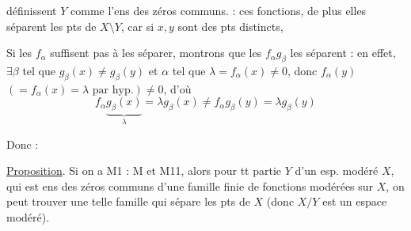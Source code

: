 
définissent $Y$ comme l'ens des zéros communs.  : ces fonctions, de plus elles séparent les pts de $X\setminus Y$, car si $x,y$ sont des pts distincts, 

Si les $f_\alpha$  suffisent pas à les séparer, montrons que les $f_\alpha g_\beta$ les séparent : en effet, $\exists\beta$ tel que $g_\beta(x)\ne g_\beta(y)$  et $\alpha$ tel que $\lambda=f_\alpha(x)\ne0$, donc $f_\alpha(y)$ $(=f_\alpha(x)=\lambda\text{ par hyp.})\ne0$, d'où
\[
f_\alpha\underbrace{g_\beta(x)}_{\lambda}=\lambda g_\beta(x)\ne f_\alpha g_\beta(y)=\lambda g_\beta(y)
\]

Donc :

\uline{Proposition}. Si on a M1 : M et M11, alors pour tt partie   $Y$ d'un esp. modéré $X$, qui est ens des zéros communs d'une famille finie de fonctions modérées sur $X$, on peut trouver une telle famille qui sépare les pts de $X$ (donc $X/Y$ est un espace modéré).


